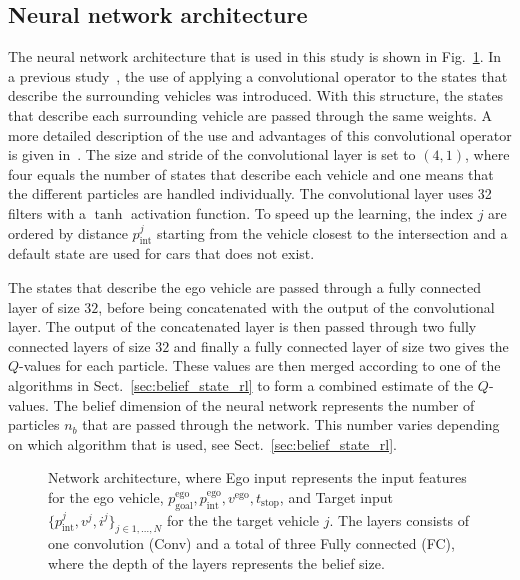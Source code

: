 \begin{table}[!bt]
\begin{tabular}{l l r}
	
			\bottomrule
		\end{tabular}
	\end{table}
	

	\subsection{Neural network architecture}
	 The neural network architecture that is used in this study is shown in Fig.~\ref{fig:network}. In a previous study~\cite{Hoel2018}, the use of applying a convolutional operator to the states that describe the surrounding vehicles was introduced. With this structure, the states that describe each surrounding vehicle are passed through the same weights. A more detailed description of the use and advantages of this convolutional operator is given in~\cite{Hoel2018}. The size and stride of the convolutional layer is set to $(4, 1)$, where four equals the number of states that describe each vehicle and one means that the different particles are handled individually. The convolutional layer uses \num{32} filters with a $\tanh$ activation function. To speed up the learning, the index $j$ are ordered by distance $p^j_\mathrm{int}$ starting from the vehicle closest to the intersection and a default state are used for cars that does not exist. 
	
	The states that describe the ego vehicle are passed through a fully connected layer of size $32$, before being concatenated with the output of the convolutional layer. The output of the concatenated layer is then passed through two fully connected layers of size $32$ and finally a fully connected layer of size two gives the $Q$-values for each particle. These values are then merged according to one of the algorithms in Sect.~\ref{sec:belief_state_rl} to form a combined estimate of the $Q$-values. The belief dimension of the neural network represents the number of particles $n_b$ that are passed through the network. This number varies depending on which algorithm that is used, see Sect.~\ref{sec:belief_state_rl}.
	
	
	
	\begin{figure}[!t]
		\centering
			\caption{Network architecture, where Ego input represents the input features for the ego vehicle, $p^\mathrm{ego}_\mathrm{goal},p^\mathrm{ego}_\mathrm{int}, v^\mathrm{ego}, t_\mathrm{stop}$, and Target input $\{p^{j}_\mathrm{int}, v^j, i^j\}_{j\in 1,\dots,N}$ for the the target vehicle $j$. The layers consists of one convolution (Conv) and a total of three Fully connected (FC), where the depth of the layers represents the belief size.}
		\label{fig:network}
	\end{figure}
	
